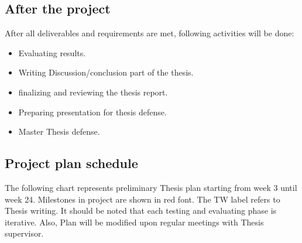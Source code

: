 \documentclass[paper=a4, fontsize=10pt,margin=0.2in]{scrartcl}
\numberwithin{equation}{section}		%
\numberwithin{figure}{section}			%
\numberwithin{table}{section}				%
\begin{document}
\subsection{After the project}
After all deliverables and requirements are met, following activities will be done:
\begin{itemize}
\item Evaluating results.
\item Writing Discussion/conclusion part of the thesis.
\item finalizing and reviewing the thesis report.
\item Preparing presentation for thesis defense.
\item Master Thesis defense.
\end{itemize}

\subsection{Project plan schedule}
The following chart represents preliminary Thesis plan starting from week 3 until week 24. Milestones in project are shown in red font. The TW label refers to Thesis writing. It should be noted that each testing and evaluating phase is iterative. Also, Plan will be modified upon regular meetings with Thesis supervisor.  \\
\end{document}
